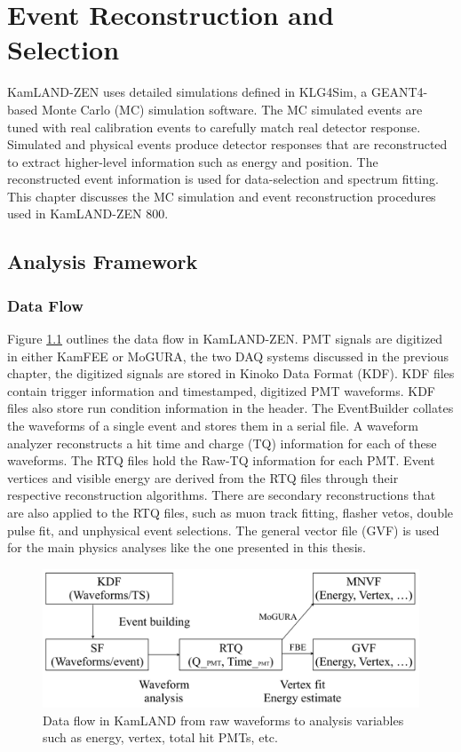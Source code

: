 \chapter{Event Reconstruction and Selection}
\label{chapter:reco_select}
\thispagestyle{myheadings}

\graphicspath{{3_Chapter_KLZ_Simulation_and_Reconstruction/Figures/}}

KamLAND-ZEN uses detailed simulations defined in KLG4Sim, a GEANT4-based Monte Carlo (MC) simulation software. The MC simulated events are tuned with real calibration events to carefully match real detector response. Simulated and physical events produce detector responses that are reconstructed to extract higher-level information such as energy and position. The reconstructed event information is used for data-selection and spectrum fitting. This chapter discusses the MC simulation and event reconstruction procedures used in KamLAND-ZEN 800.

\section{Analysis Framework}
\subsection{Data Flow}
Figure \ref{fig:dataflow} outlines the data flow in KamLAND-ZEN. PMT signals are digitized in either KamFEE or MoGURA, the two DAQ systems discussed in the previous chapter, the digitized signals are stored in Kinoko Data Format (KDF). KDF files contain trigger information and timestamped, digitized PMT waveforms. KDF files also store run condition information in the header. The EventBuilder collates the waveforms of a single event and stores them in a serial file. A waveform analyzer reconstructs a hit time and charge (TQ) information for each of these waveforms. The RTQ files hold the Raw-TQ information for each PMT. Event vertices and visible energy are derived from the RTQ files through their respective reconstruction algorithms. There are secondary reconstructions that are also applied to the RTQ files, such as muon track fitting, flasher vetos, double pulse fit, and unphysical event selections. The general vector file (GVF) is used for the main physics analyses like the one presented in this thesis.

\begin{figure}[htb]
	\centering
	\includegraphics[scale=0.3]{dataflow.png}
	\caption{Data flow in KamLAND from raw waveforms to analysis variables such as energy, vertex, total hit PMTs, etc. \cite{ozaki_phd}}
	\label{fig:dataflow}
\end{figure}

